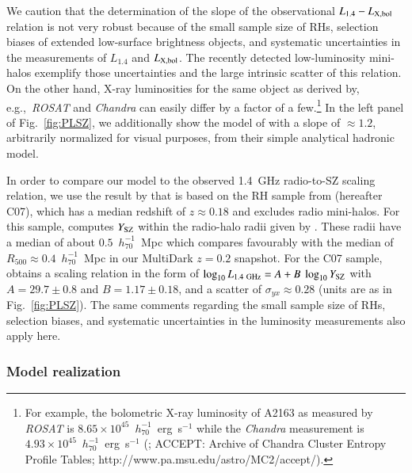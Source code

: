 \documentclass[useAMS,usenatbib]{mn2e}
\begin{document}
We caution that the determination of the slope of the observational
$L_{1.4}-L_{{\mathrm{X,bol}}}$ relation is not very robust because of the small
sample size of RHs, selection biases of extended low-surface brightness objects,
and systematic uncertainties in the measurements of $L_{1.4}$ and
$L_{{\mathrm{X,bol}}}$. The recently detected low-luminosity mini-halos exemplify
those uncertainties and the large intrinsic scatter of this relation. On the
other hand, X-ray luminosities for the same object as derived by,
e.g.,~\emph{ROSAT} and \emph{Chandra} can easily differ by a factor of a
few.\footnote{For example, the bolometric X-ray luminosity of A2163 as measured
  by \emph{ROSAT} is $8.65\times10^{45}$~$h_{70}^{-1}$~erg~s$^{-1}$
  \citep{2009A&A...507..661B} while the \emph{Chandra} measurement is
  $4.93\times10^{45}$~$h_{70}^{-1}$~erg~s$^{-1}$ (\citealp{2009ApJS..182...12C};
  ACCEPT: Archive of Chandra Cluster Entropy Profile Tables;
  http://www.pa.msu.edu/astro/MC2/accept/).}  In the left panel of
Fig.~\ref{fig:PLSZ}, we additionally show the model of
\citet{2009JCAP...09..024K} with a slope of $\approx1.2$, arbitrarily normalized
for visual purposes, from their simple analytical hadronic model.

In order to compare our model to the observed 1.4~GHz radio-to-SZ scaling
relation, we use the result by \cite{2012MNRAS.421L.112B} that is based on the
RH sample from \cite{2007MNRAS.378.1565C} (hereafter C07), which has a
median redshift of $z \approx 0.18$ and excludes radio mini-halos. For this
sample, \cite{2012MNRAS.421L.112B} computes $Y_{{\mathrm{SZ}}}$ within the radio-halo
radii given by \cite{2007MNRAS.378.1565C}. These radii have a median of about
$0.5$~$h_{70}^{-1}$~Mpc which compares favourably with the median of $R_{500}
\approx 0.4$~$h_{70}^{-1}$~Mpc in our MultiDark $z = 0.2$ snapshot. For the C07
sample, \cite{2012MNRAS.421L.112B} obtains a scaling relation in the form of
$\log_{10} L_{1.4~{\mathrm{GHz}}} = A + B~\log_{10} Y_{{\mathrm{SZ}}}$ with $A=29.7\pm0.8$
and $B=1.17\pm0.18$, and a scatter of $\sigma_{yx} \approx 0.28$ (units are as
in Fig.~\ref{fig:PLSZ}). The same comments regarding the small sample size of
RHs, selection biases, and systematic uncertainties in the luminosity
measurements also apply here.


\subsubsection{Model realization}
\end{document}
